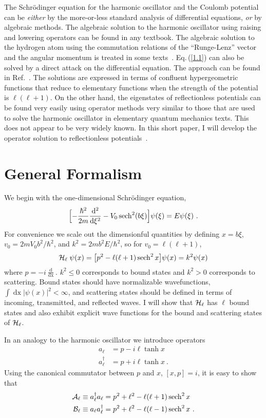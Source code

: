 \documentclass[12pt,twoside]{article}
\newcommand{\sech}{\mathop{\rm sech}\nolimits}
\newcommand{\rd}[1]{\mathop{\mathrm{d}#1}}
\begin{document}
The Schr\"odinger equation for the harmonic oscillator and the Coulomb potential can be \emph{either} by the more-or-less standard analysis of differential equations, \emph{or} by algebraic methods.  The algebraic solution to the harmonic oscillator using raising and lowering operators can be found in any textbook.  The algebraic solution to the hydrogen atom using the commutation relations of the ``Runge-Lenz'' vector and the angular momentum is treated in some texts~\cite{ref:1.1}. 
Eq.\,(\ref{1.1}) can also be solved by a direct attack on the differential equation.  The approach can be found in Ref.~\cite{ref:1.2}.  The solutions 
are expressed in terms of confluent hypergeometric functions that reduce to elementary functions when the strength of the potential is $\ell(\ell+1)$.  On the other hand, the eigenstates of reflectionless potentials can be found very easily using operator methods very similar to those that are used to solve the harmonic oscillator in elementary quantum mechanics texts.  This does not appear to be very widely known.  In this short paper, I will develop the operator solution to reflectionless potentials~\cite{ref:1.3}.

\section{General Formalism}\label{s2}
We begin with the one-dimensional Schr\"odinger equation,
%
\begin{equation}
\Bigl[-\frac{\hbar^2}{2m}\frac{\rd{^2}}{\rd{\xi^2}}-
  V_0\sech^2(b\xi)\Bigr]\psi(\xi) = E\psi(\xi)\ .
  \label{2.0}
\end{equation}
%
For convenience we scale out the dimensionful quantities by defining $x=b\xi$, $v_0=2mV_0b^2/\hbar^2$, and $k^2=2mb^2E/\hbar^2$, so for $v_0=\ell(\ell+1)$,
%
\begin{equation}
  {\cal H}_\ell \;\psi(x) = \bigl[p^2 - \ell(\ell+1)\sech^2x\bigr]\psi(x) =
k^2\psi(x)
  \label{2.1}
\end{equation}
%
where $p = -i \frac {\rd{}}{\rd{x}}$.  $k^2\le 0$ corresponds to bound
states and
$k^2>0$  corresponds to scattering.  Bound states should have normalizable wavefunctions, $\int \rd x \left|\psi(x)\right|^2 < \infty$, and scattering states should be defined in terms of incoming, transmitted, and reflected waves.  I will show that ${\cal H}_\ell $ has $\ell$ bound states and also exhibit explicit wave functions for the bound and scattering states of ${\cal H}_\ell $.

In an analogy to the harmonic oscillator we introduce operators
%
\begin{align}
  a_\ell &=  p-i\ell\tanh x\nonumber\\
  a_\ell^\dagger &=  p+i\ell\tanh x\ .
  \label{2.2}
\end{align}
%
Using the canonical commutator between $p$ and $x$, $[x,p]=i$, it is easy to show that
%
\begin{align}
  {\cal A}_\ell  \equiv a_\ell^\dagger a_\ell &=    p^2+\ell^2-\ell(\ell+1)\sech^2x
  \nonumber\\
  {\cal B}_\ell  \equiv a_\ell a_\ell^\dagger &=    p^2+\ell^2-\ell(\ell-1)\sech^2x\ .
  \label{2.3}
\end{align}
%
\end{document}
